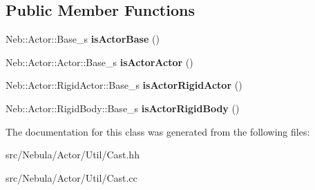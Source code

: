 \subsection*{Public Member Functions}
\begin{DoxyCompactItemize}
\item 
\hypertarget{classNeb_1_1Actor_1_1Util_1_1Cast_ab9c1dab6a3875c423ca7671cddb0cd7e}{Neb\-::\-Actor\-::\-Base\-\_\-s {\bfseries is\-Actor\-Base} ()}\label{classNeb_1_1Actor_1_1Util_1_1Cast_ab9c1dab6a3875c423ca7671cddb0cd7e}

\item 
\hypertarget{classNeb_1_1Actor_1_1Util_1_1Cast_a08ab9241db8e6bbcc7e155ac2a5df493}{Neb\-::\-Actor\-::\-Actor\-::\-Base\-\_\-s {\bfseries is\-Actor\-Actor} ()}\label{classNeb_1_1Actor_1_1Util_1_1Cast_a08ab9241db8e6bbcc7e155ac2a5df493}

\item 
\hypertarget{classNeb_1_1Actor_1_1Util_1_1Cast_a88235da713dbeded9be1efb4e53a6ca4}{Neb\-::\-Actor\-::\-Rigid\-Actor\-::\-Base\-\_\-s {\bfseries is\-Actor\-Rigid\-Actor} ()}\label{classNeb_1_1Actor_1_1Util_1_1Cast_a88235da713dbeded9be1efb4e53a6ca4}

\item 
\hypertarget{classNeb_1_1Actor_1_1Util_1_1Cast_a053d28c5b42c024dc970a5f52627c104}{Neb\-::\-Actor\-::\-Rigid\-Body\-::\-Base\-\_\-s {\bfseries is\-Actor\-Rigid\-Body} ()}\label{classNeb_1_1Actor_1_1Util_1_1Cast_a053d28c5b42c024dc970a5f52627c104}

\end{DoxyCompactItemize}


The documentation for this class was generated from the following files\-:\begin{DoxyCompactItemize}
\item 
src/\-Nebula/\-Actor/\-Util/Cast.\-hh\item 
src/\-Nebula/\-Actor/\-Util/Cast.\-cc\end{DoxyCompactItemize}
